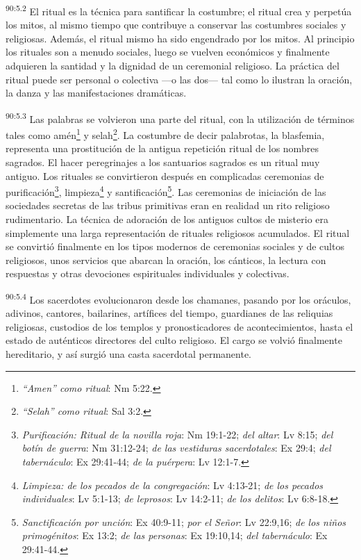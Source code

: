 \documentclass[twoside, 11pt]{book}
\begin{document}
\par
\textsuperscript{90:5.2} El ritual es la técnica para santificar la costumbre; el ritual crea y perpetúa los mitos, al mismo tiempo que contribuye a conservar las costumbres sociales y religiosas. Además, el ritual mismo ha sido engendrado por los mitos. Al principio los rituales son a menudo sociales, luego se vuelven económicos y finalmente adquieren la santidad y la dignidad de un ceremonial religioso. La práctica del ritual puede ser personal o colectiva ---o las dos--- tal como lo ilustran la oración, la danza y las manifestaciones dramáticas.

\par
\textsuperscript{90:5.3} Las palabras se volvieron una parte del ritual, con la utilización de términos tales como amén\footnote{\textit{``Amen'' como ritual}: Nm 5:22.} y selah\footnote{\textit{``Selah''  como ritual}: Sal 3:2.}. La costumbre de decir palabrotas, la blasfemia, representa una prostitución de la antigua repetición ritual de los nombres sagrados. El hacer peregrinajes a los santuarios sagrados es un ritual muy antiguo. Los rituales se convirtieron después en complicadas ceremonias de purificación\footnote{\textit{Purificación: Ritual de la novilla roja}: Nm 19:1-22; \textit{del altar}: Lv 8:15; \textit{del botín de guerra}: Nm 31:12-24; \textit{de las vestiduras sacerdotales}: Ex 29:4; \textit{del tabernáculo}: Ex 29:41-44; \textit{de la puérpera}: Lv 12:1-7.}, limpieza\footnote{\textit{Limpieza: de los pecados de la congregación}: Lv 4:13-21; \textit{de los pecados individuales}: Lv 5:1-13; \textit{de leprosos}: Lv 14:2-11; \textit{de los delitos}: Lv 6:8-18.} y santificación\footnote{\textit{Sanctificación por unción}: Ex 40:9-11; \textit{por el Señor}: Lv 22:9,16; \textit{de los niños primogénitos}: Ex 13:2; \textit{de las personas}: Ex 19:10,14; \textit{del tabernáculo}: Ex 29:41-44.}. Las ceremonias de iniciación de las sociedades secretas de las tribus primitivas eran en realidad un rito religioso rudimentario. La técnica de adoración de los antiguos cultos de misterio era simplemente una larga representación de rituales religiosos acumulados. El ritual se convirtió finalmente en los tipos modernos de ceremonias sociales y de cultos religiosos, unos servicios que abarcan la oración, los cánticos, la lectura con respuestas y otras devociones espirituales individuales y colectivas.

\par
\textsuperscript{90:5.4} Los sacerdotes evolucionaron desde los chamanes, pasando por los oráculos, adivinos, cantores, bailarines, artífices del tiempo, guardianes de las reliquias religiosas, custodios de los templos y pronosticadores de acontecimientos, hasta el estado de auténticos directores del culto religioso. El cargo se volvió finalmente hereditario, y así surgió una casta sacerdotal permanente.
\end{document}
